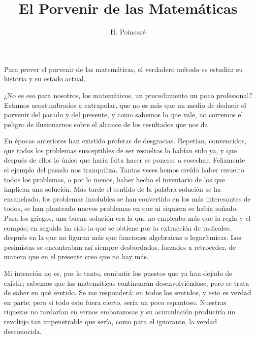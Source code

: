 \documentclass[a4paper, 12pt]{article}
\title{El Porvenir de las Matemáticas}
\author{H. Poincaré}
\date{}
\begin{document}
\begin{tcolorbox}[colback=blue!5!white,colframe=blue!75!black]

\vspace{-1.8cm}
\textbf \maketitle

\end{tcolorbox}

\bigskip

Para prever el porvenir de las matemáticas, el verdadero método es
estudiar su historia y su estado actual.

¿No es eso para nosotros, los matemáticos, un procedimiento un poco
profesional? Estamos acostumbrados a extrapolar, que no es más que un
medio de deducir el porvenir del pasado y del presente, y como sabemos lo
que vale, no corremos el peligro de ilusionarnos sobre el alcance de los
resultados que nos da.

En épocas anteriores han existido profetas de desgracias. Repetían,
convencidos, que todos los problemas susceptibles de ser resueltos lo habían sido ya, y que después de ellos lo único que haría
falta hacer es ponerse a cosechar. Felizmente el ejemplo del pasado nos
tranquiliza. Tantas veces hemos creído haber resuelto todos los
problemas, o por lo menos, haber hecho el inventario de los que implican una
solución. Más tarde el sentido de la palabra solución se ha
ensanchado, los problemas insolubles se han convertido en los más
interesantes de todos, se han planteado nuevos problemas en que ni siquiera
se había soñado. Para los griegos, una buena solución era la
que no empleaba más que la regla y el compás; en seguida ha sido la
que se obtiene por la extracción de radicales, después en la que no
figuran más que funciones algebraicas o logarítmicas. Los
pesimistas se encontraban así siempre desbordados, forzados a
retroceder, de manera que en el presente creo que no hay más.

Mi intención no es, por lo tanto, combatir los puestos que ya han dejado
de existir; sabemos que las matemáticas continuarán desenvolviéndose, pero se trata de saber en qué
sentido. Se me responderá: \guillemotleft en todos los sentidos\guillemotright, y esto es verdad en parte; pero si todo esto fuera
cierto, sería un poco espantoso. Nuestras riquezas no tardarían en
sernos embarazosas y su acumulación produciría un revoltijo tan
impenetrable que sería, como para el ignorante, la verdad desconocida.
\end{document}
